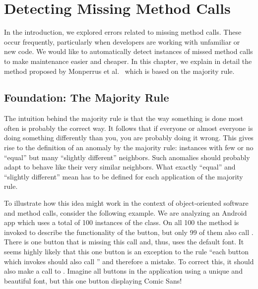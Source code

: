 \chapter{Detecting Missing Method Calls}\label{ch:dmmc}

In the introduction, we explored errors related to missing method calls.
These occur frequently, particularly when developers are working with unfamiliar or new code.
We would like to automatically detect instances of missed method calls to make maintenance easier and cheaper.
In this chapter, we explain in detail the method proposed by Monperrus et al.~\cite{monperrus2010detecting}\cite{monperrus2013detecting} which is based on the majority rule.

\section{Foundation: The Majority Rule}\label{sec:majority}

The intuition behind the majority rule is that the way something is done most often is probably the correct way.
It follows that if everyone or almost everyone is doing something differently than you, you are probably doing it wrong.
This gives rise to the definition of an anomaly by the majority rule: instances with few or no ``equal'' but many ``slightly different'' neighbors.
Such anomalies should probably adapt to behave like their very similar neighbors.
What exactly ``equal'' and ``slightly different'' mean has to be defined for each application of the majority rule.

To illustrate how this idea might work in the context of object-oriented software and method calls, consider the following example.
We are analyzing an Android app which uses a total of 100 instances of the  class.
On all 100 the method  is invoked to describe the functionality of the button, but only 99 of them also call .
There is one button that is missing this call and, thus, uses the default font.
It seems highly likely that this one button is an exception to the rule ``each button which invokes  should also call '' and therefore a mistake.
To correct this, it should also make a call to .
Imagine all buttons in the application using a unique and beautiful font, but this one button displaying Comic Sans!

